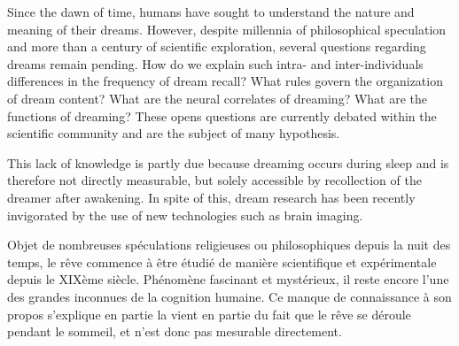 \label{sec:abstract}
\vspace*{-10mm}

Since the dawn of time, humans have sought to understand the nature and meaning of their dreams. However, despite millennia of philosophical speculation and more than a century of scientific exploration, several questions regarding dreams remain pending. How do we explain such intra- and inter-individuals differences in the frequency of dream recall? What rules govern the organization of dream content? What are the neural correlates of dreaming? What are the functions of dreaming? These opens questions are currently debated within the scientific community and are the subject of many hypothesis.

This lack of knowledge is partly due because dreaming occurs during sleep and is therefore not directly measurable, but solely accessible by recollection of the dreamer after awakening. In spite of this, dream research has been recently invigorated by the use of new technologies such as brain imaging.

\cleardoublepage

\label{sec:résumé}
\vspace*{-10mm}

Objet de nombreuses spéculations religieuses ou philosophiques depuis la nuit des temps, le rêve commence à être étudié de manière scientifique et expérimentale depuis le XIXème siècle. Phénomène fascinant et mystérieux, il reste encore l'une des grandes inconnues de la cognition humaine. Ce manque de connaissance à son propos s'explique en partie la vient en partie du fait que le rêve se déroule pendant le sommeil, et n'est donc pas mesurable directement.
